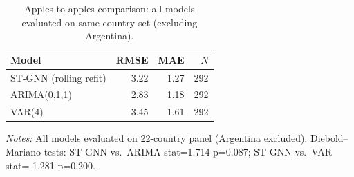 \begin{table}[ht]
  \centering
  \caption{Apples-to-apples comparison: all models evaluated on same country set (excluding Argentina).}
  \label{tab:apples}
  \begin{tabular}{lrrr}
    \toprule
    Model & RMSE & MAE & $N$ \\
    \midrule
    ST-GNN (rolling refit) & 3.22 & 1.27 & 292 \\
    ARIMA(0,1,1)           & 2.83 & 1.18 & 292 \\
    VAR(4)                 & 3.45 & 1.61 & 292 \\
    \bottomrule
  \end{tabular}
  \vspace{0.5em}
  \begin{minipage}{\linewidth}
    \footnotesize
    \textit{Notes:} All models evaluated on 22-country panel (Argentina excluded).
    Diebold--Mariano tests: ST-GNN vs.\ ARIMA stat=1.714 p=0.087; ST-GNN vs.\ VAR stat=-1.281 p=0.200.
  \end{minipage}
\end{table}